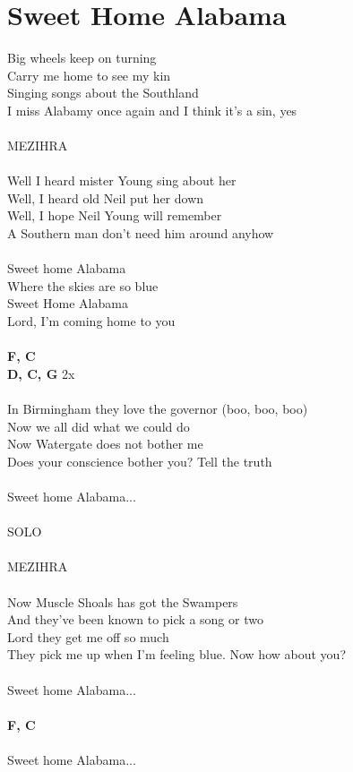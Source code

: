 \section{Sweet Home Alabama}
Big wheels keep on turning\\
Carry me home to see my kin\\
Singing songs about the Southland\\
I miss Alabamy once again and I think it's a sin, yes\\
\\
MEZIHRA\\
\\
Well I heard mister Young sing about her\\
Well, I heard old Neil put her down\\
Well, I hope Neil Young will remember\\
A Southern man don't need him around anyhow\\
\\
Sweet home Alabama\\
Where the skies are so blue\\
Sweet Home Alabama\\
Lord, I'm coming home to you\\
\\
\footnotesize\textbf{F, C}\\
\footnotesize\textbf{D, C, G} 2x\\
\normalsize
\\
In Birmingham they love the governor (boo, boo, boo)\\
Now we all did what we could do\\
Now Watergate does not bother me\\
Does your conscience bother you? Tell the truth\\
\\
Sweet home Alabama...\\
\\
SOLO\\
\\
MEZIHRA\\
\\
Now Muscle Shoals has got the Swampers\\
And they've been known to pick a song or two\\
Lord they get me off so much\\
They pick me up when I'm feeling blue. Now how about you?\\
\\
Sweet home Alabama...\\
\\
\footnotesize\textbf{F, C}\\
\normalsize
\\
Sweet home Alabama...